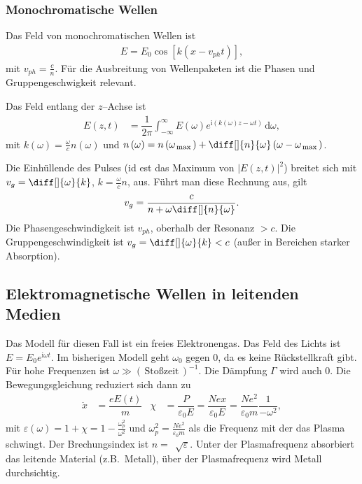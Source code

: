 \documentclass[a4paper,12pt]{article}
\newcommand{\td}{\,\text{d}}
\numberwithin{equation}{section}
\begin{document}
\subsubsection{Monochromatische Wellen}
Das Feld von monochromatischen Wellen ist
\begin{align} 
        E=E_0\cos \left[k\left(x-v_{ph}t\right)\right]
,\end{align} 
mit $v_{ph}=\tfrac{c}{n}$. Für die Ausbreitung von Wellenpaketen ist die Phasen und Gruppengeschwigkeit relevant.\par
Das Feld entlang der $z$--Achse ist 
\begin{align} 
        E\left(z,t\right)&=\dfrac{1}{2\pi }\int_{-\infty}^{\infty}E\left(\omega \right)e^{\text{i}\left(k\left(\omega \right)z-\omega t\right)}\td \omega 
,\end{align} 
mit $k\left(\omega \right)=\tfrac{\omega }{c}n\left(\omega \right)$ und $n\left(\omega \right)=n\left(\omega _{\,\text{max}\,}\right)+\diff[]{n}{\omega }\left(\omega -\omega _{\,\text{max}\,}\right)$.\par
Die Einhüllende des Pulses (id est das Maximum von $|E\left(z,t\right)|^2$) breitet sich mit $v_g=\diff[]{\omega }{k}$, $k=\tfrac{\omega }{c}n$, aus. Führt man diese Rechnung aus, gilt
\begin{align} 
        v_g=\dfrac{c}{n+\omega \diff[]{n}{\omega }}
.\end{align} 
Die Phasengeschwindigkeit ist $v_{ph}$, oberhalb der Resonanz $>c$. Die Gruppengeschwindigkeit ist $v_g=\diff[]{\omega }{k}<c$ (außer in Bereichen starker Absorption).

\subsection{Elektromagnetische Wellen in leitenden Medien}
Das Modell für diesen Fall ist ein freies Elektronengas. Das Feld des Lichts ist $E=E_0e^{\text{i}\omega t}$. Im bisherigen Modell geht $\omega _0$ gegen 0, da es keine Rückstellkraft gibt. Für hohe Frequenzen ist $\omega \gg \left(\,\text{Stoßzeit}\,\right)^{-1}$. Die Dämpfung $\Gamma $ wird auch 0. Die Bewegungsgleichung reduziert sich dann zu
\begin{align} 
        \ddot{x}&=\dfrac{eE\left(t\right)}{m}&\chi&=\dfrac{P}{\varepsilon _0E}=\dfrac{Nex}{\varepsilon _0E}=\dfrac{Ne^2}{\varepsilon _0m}\dfrac{1}{-\omega ^2}
,\end{align} 
mit $\varepsilon \left(\omega \right)=1+\chi=1-\tfrac{\omega _p^2}{\omega ^2}$ und $\omega _p^2=\tfrac{Ne^2}{\varepsilon _0m}$ als die Frequenz mit der das Plasma schwingt. Der Brechungsindex ist $n=\,\sqrt[]{\varepsilon }$. Unter der Plasmafrequenz absorbiert das leitende Material (z.B.\ Metall), über der Plasmafrequenz wird Metall durchsichtig.

\end{document}

